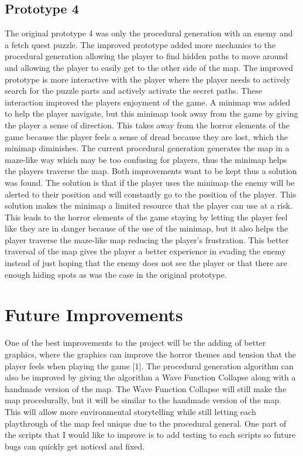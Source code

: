 \documentclass{article}
\begin{document}
\subsection{Prototype 4}
The original prototype 4 was only the procedural generation with an enemy and a fetch quest puzzle. The improved
prototype added more mechanics to the procedural generation allowing the player to find hidden paths to move around
and allowing the player to easily get to the other side of the map. The improved prototype is more interactive with
the player where the player needs to actively search for the puzzle parts and actively activate the secret paths.
These interaction improved the players enjoyment of the game.
A minimap was added to help the player navigate, but this minimap took away from the game by giving the player a 
sense of direction. This takes away from the horror elements of the game because the player feels a sense of dread
because they are lost, which the minimap diminishes. The current procedural generation generates the map in a maze-like
way which may be too confusing for players, thus the minimap helps the players traverse the map. Both improvements want
to be kept thus a solution was found. The solution is that if the player uses the minimap the enemy will be alerted to
their position and will constantly go to the position of the player. This solution makes the minimap a limited resource
that the player can use at a risk. This leads to the horror elements of the game staying by letting the player feel like
they are in danger because of the use of the minimap, but it also helps the player traverse the maze-like map reducing
the player's frustration. This better traversal of the map gives the player a better experience in evading the enemy
instead of just hoping that the enemy does not see the player or that there are enough hiding spots as was the case
in the original prototype.

\section{Future Improvements}
One of the best improvements to the project will be the adding of better graphics, where the graphics can improve the 
horror themes and tension that the player feels when playing the game [1].
The procedural generation algorithm can also be improved by giving the algorithm a Wave Function Collapse along with
a handmade version of the map. The Wave Function Collapse will still make the map procedurally, but it will be similar
to the handmade version of the map. This will allow more environmental storytelling while still letting each playthrough
of the map feel unique due to the procedural general.
One part of the scripts that I would like to improve is to add testing to each scripts so future bugs can quickly get 
noticed and fixed.
\end{document}
